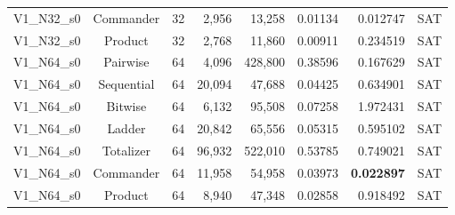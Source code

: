 \documentclass[a4paper,fleqn]{cas-sc}
\begin{document}
\begin{table}[!htbp]
\begin{tabular*}{\textwidth}{lcrrrrrc}
V1\_N32\_s0 & Commander & 32 & 2,956 & 13,258 & 0.01134 & 0.012747 & SAT \\
V1\_N32\_s0 & Product & 32 & 2,768 & 11,860 & 0.00911 & 0.234519 & SAT \\
\midrule
V1\_N64\_s0 & Pairwise & 64 & 4,096 & 428,800 & 0.38596 & 0.167629 & SAT \\
V1\_N64\_s0 & Sequential & 64 & 20,094 & 47,688 & 0.04425 & 0.634901 & SAT \\
V1\_N64\_s0 & Bitwise & 64 & 6,132 & 95,508 & 0.07258 & 1.972431 & SAT \\
V1\_N64\_s0 & Ladder & 64 & 20,842 & 65,556 & 0.05315 & 0.595102 & SAT \\
V1\_N64\_s0 & Totalizer & 64 & 96,932 & 522,010 & 0.53785 & 0.749021 & SAT \\
V1\_N64\_s0 & Commander & 64 & 11,958 & 54,958 & 0.03973 & \textbf{0.022897} & SAT \\
V1\_N64\_s0 & Product & 64 & 8,940 & 47,348 & 0.02858 & 0.918492 & SAT \\
\bottomrule
\end{tabular*}
\end{table}
\end{document}
